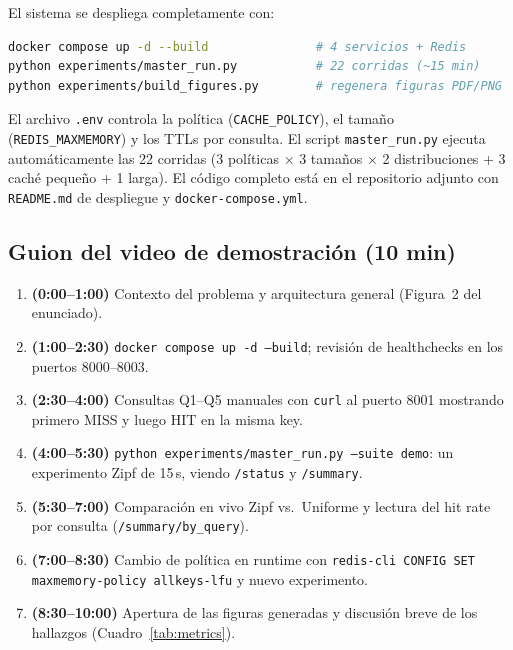 \documentclass[11pt,a4paper]{article}
\begin{document}
El sistema se despliega completamente con:

\begin{lstlisting}[language=bash,basicstyle=\ttfamily\scriptsize]
docker compose up -d --build               # 4 servicios + Redis
python experiments/master_run.py           # 22 corridas (~15 min)
python experiments/build_figures.py        # regenera figuras PDF/PNG
\end{lstlisting}

El archivo \texttt{.env} controla la política (\texttt{CACHE\_POLICY}),
el tamaño (\texttt{REDIS\_MAXMEMORY}) y los TTLs por consulta. El script
\texttt{master\_run.py} ejecuta automáticamente las 22 corridas (3 políticas
$\times$ 3 tamaños $\times$ 2 distribuciones + 3 caché pequeño + 1 larga).
El código completo está en el repositorio adjunto con \texttt{README.md} de
despliegue y \texttt{docker-compose.yml}.

\subsection{Guion del video de demostración (10 min)}

\begin{enumerate}[leftmargin=*,itemsep=2pt]
\item \textbf{(0:00--1:00)} Contexto del problema y arquitectura general
  (Figura~2 del enunciado).
\item \textbf{(1:00--2:30)} \texttt{docker compose up -d --build}; revisión
  de healthchecks en los puertos 8000--8003.
\item \textbf{(2:30--4:00)} Consultas Q1--Q5 manuales con \texttt{curl} al
  puerto 8001 mostrando primero MISS y luego HIT en la misma key.
\item \textbf{(4:00--5:30)} \texttt{python experiments/master\_run.py --suite demo}:
  un experimento Zipf de 15\,s, viendo \texttt{/status} y \texttt{/summary}.
\item \textbf{(5:30--7:00)} Comparación en vivo Zipf vs.\ Uniforme y
  lectura del hit rate por consulta (\texttt{/summary/by\_query}).
\item \textbf{(7:00--8:30)} Cambio de política en runtime con
  \texttt{redis-cli CONFIG SET maxmemory-policy allkeys-lfu} y nuevo
  experimento.
\item \textbf{(8:30--10:00)} Apertura de las figuras generadas y discusión
  breve de los hallazgos (Cuadro~\ref{tab:metrics}).
\end{enumerate}

\end{document}
